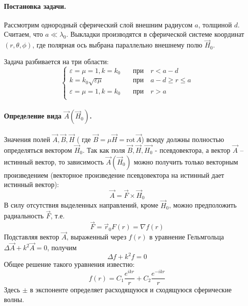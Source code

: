 \documentclass[a4paper,12pt]{article}
\renewcommand\epsilon{\varepsilon}
\begin{document}
\paragraph{Постановка задачи.} Рассмотрим однородный сферический слой внешним радиусом $a$, толщиной $d$. Считаем, что $a\ll\lambda_0$. Выкладки производятся в сферической системе координат $(r,\theta,\phi)$, где полярная ось выбрана параллельно внешнему полю $\vec{H}_0$.

Задача разбивается на три области:
\begin{equation}
	\left\{\begin{aligned}
		\epsilon=\mu=1, k=k_0 &\quad\text{при}\quad r<a-d\\
		k=k_0\sqrt{\epsilon\mu} &\quad\text{при}\quad  a-d \geq r\leq a\\
		\epsilon=\mu=1, k=k_0 &\quad\text{при}\quad r>a\\
	\end{aligned}\right.
\end{equation}

\paragraph{Определение вида $\vec{A}(\vec{H}_0)$.} Значения полей $\vec{A},\vec{B},\vec{H}$ ( где $\vec{B}=\mu\vec{H}=\mathrm{rot}\,\vec{A}$) всюду должны полностью определяться вектором $\vec{H}_0$. Так как поля $\vec{B},\vec{H},\vec{H_0}$ - псевдовектора, а вектор $\vec{A}$ -- истинный вектор, то зависимость $\vec{A}(\vec{H}_0)$ можно получить только векторным произведением (векторное произведение псевдовектора на истинный дает истинный вектор):
\begin{equation}
	\vec{A}=\vec{F}\times\vec{H}_0
\end{equation}
В силу отсутствия выделенных направлений, кроме $\vec{H}_0$, можно предположить радиальность $\vec{F}$, т.е. 
\begin{equation}
	\vec{F}=\vec{r}_0 F(r)=\nabla f(r)
\end{equation}
Подставляя вектор $\vec{A}$, выраженный через $f(r)$ в уравнение Гельмгольца $\Delta\vec{A}+k^2\vec{A}=0$, получим
\begin{equation}
	\Delta f +k^2f=0
\end{equation}
Общее решение такого уравнения известно:
\begin{equation}
	f(r)=C_1\frac{e^{ikr}}{r}+C_2\frac{e^{-ikr}}{r}
\end{equation}
Здесь $\pm$ в экспоненте определяет расходящуюся и сходящуюся сферические волны.
\end{document}
